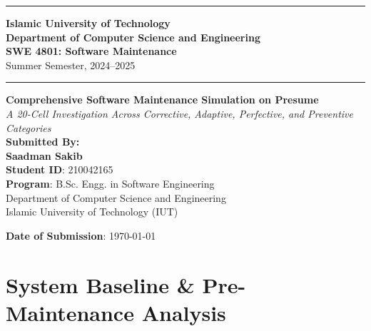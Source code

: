 \documentclass[12pt,a4paper]{article}
\begin{document}
\begin{titlepage}
    \begin{center}
        \vspace*{0.8cm}
        \noindent\rule{\textwidth}{1.5pt}
        \vspace{0.3cm}

        \Huge{\textbf{Islamic University of Technology}}\\[0.25cm]
        \large{\textbf{Department of Computer Science and Engineering}}\\
        \vspace{0.2cm}
        \Large{\textbf{SWE 4801: Software Maintenance}}\\
        \Large{Summer Semester, 2024--2025}\\
        \noindent\rule{\textwidth}{0.5pt}

        \vspace{1.2cm}
        \LARGE{\textbf{Comprehensive Software Maintenance Simulation on Presume}}\\[0.35cm]
        \large{\textit{A 20-Cell Investigation Across Corrective, Adaptive, Perfective, and Preventive Categories}}\\[1.2cm]

        \large{
            \textbf{Submitted By:}\\[0.15cm]
            \textbf{Saadman Sakib}\\[0.15cm]
            \textbf{Student ID}: 210042165\\[0.15cm]
            \textbf{Program}: B.Sc. Engg. in Software Engineering\\[0.15cm]
            Department of Computer Science and Engineering\\[0.15cm]
            Islamic University of Technology (IUT)
        }

        \vfill
        \large{\textbf{Date of Submission}: \today}
    \end{center}
\end{titlepage}

\newpage
\tableofcontents
\newpage

\section{System Baseline \& Pre-Maintenance Analysis}
\end{document}
